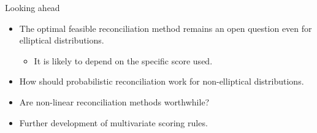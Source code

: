 \documentclass{beamer}
\begin{document}
   \begin{frame}{Looking ahead}
     \begin{itemize}
     	\item The optimal feasible reconciliation method remains an open question even for elliptical distributions.
     	\pause
     	\begin{itemize}
     		\item It is likely to depend on the specific score used.
     	\end{itemize}
        \pause
        \item How should probabilistic reconciliation work for non-elliptical distributions.
        \pause
        \item Are non-linear reconciliation methods worthwhile?
        \pause
        \item Further development of multivariate scoring rules.
     \end{itemize}	
   \end{frame}
\end{document}
